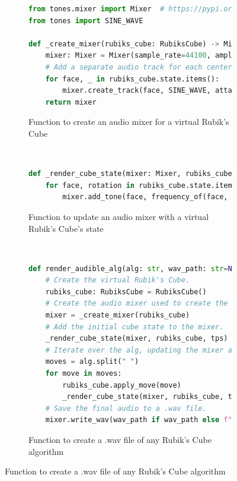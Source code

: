\begin{figure}[h]
\caption{Generating audio for any Rubik's Cube algorithm}
\label{fig:code-generate-alg-audio}
\begin{subfigure}{\textwidth}
\caption{Function to create an audio mixer for a virtual Rubik's Cube}
\label{fig:code-create-mixer}
\begin{lstlisting}[language=Python]
from tones.mixer import Mixer  # https://pypi.org/project/tones/
from tones import SINE_WAVE

def _create_mixer(rubiks_cube: RubiksCube) -> Mixer:
    mixer: Mixer = Mixer(sample_rate=44100, amplitude=1)
    # Add a separate audio track for each centerpiece.
    for face, _ in rubiks_cube.state.items():
        mixer.create_track(face, SINE_WAVE, attack=0, decay=0)
    return mixer
\end{lstlisting}
\vspace*{2mm}
\end{subfigure}\\
\begin{subfigure}{\textwidth}
\caption{Function to update an audio mixer with a virtual Rubik's Cube's state}
\label{fig:code-render-cube-state}
\begin{lstlisting}[language=Python, firstnumber=last]
def _render_cube_state(mixer: Mixer, rubiks_cube: RubiksCube, tps: float):
    for face, rotation in rubiks_cube.state.items():
        mixer.add_tone(face, frequency_of(face, rotation), duration=1 / tps)
\end{lstlisting}
\vspace*{2mm}
\end{subfigure}\\
\begin{subfigure}{\textwidth}
\caption{Function to create a .wav file of any Rubik's Cube algorithm}
\label{fig:code-render-audible-alg}
\begin{lstlisting}[language=Python, firstnumber=last]
def render_audible_alg(alg: str, wav_path: str=None, tps: float=4):
    # Create the virtual Rubik's Cube.
    rubiks_cube: RubiksCube = RubiksCube()
    # Create the audio mixer used to create the synthesized audio.
    mixer = _create_mixer(rubiks_cube)
    # Add the initial cube state to the mixer.
    _render_cube_state(mixer, rubiks_cube, tps)
    # Iterate over the alg, updating the mixer after each move.
    moves = alg.split(" ")
    for move in moves:
        rubiks_cube.apply_move(move)
        _render_cube_state(mixer, rubiks_cube, tps)
    # Save the final audio to a .wav file.
    mixer.write_wav(wav_path if wav_path else f"{alg}.wav")
\end{lstlisting}
\end{subfigure}
\end{figure}

